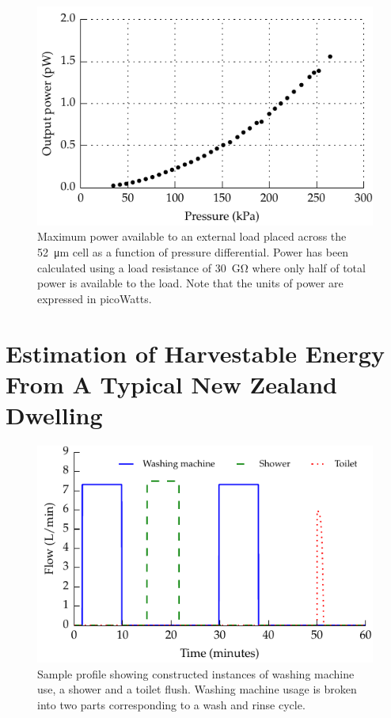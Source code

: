 \documentclass[10pt,final,journal]{IEEEtran}
\begin{document}
    \begin{figure}
        \begin{center}
        \includegraphics[width=\linewidth]{graph_powerPressure}
        \end{center}
        \caption{Maximum power available to an external load placed across the \SI{52}{\micro\meter} cell as a function of pressure differential. Power has been calculated using a load resistance of \SI{30}{\giga\ohm} where only half of total power is available to the load. Note that the units of power are expressed in picoWatts.}
        \label{fig:cellPowerPressure}
    \end{figure}


    \section{Estimation of Harvestable Energy From A Typical New Zealand Dwelling}
    \label{sect:waterConsumption}
    \begin{figure}
        \begin{center}
        \includegraphics[width=\linewidth]{graph_profile}
        \end{center}
        \caption{Sample profile showing constructed instances of washing machine use, a shower and a toilet flush.
        Washing machine usage is broken into two parts corresponding to a wash and rinse cycle.}
        \label{fig:profileSample}
    \end{figure}
\end{document}
